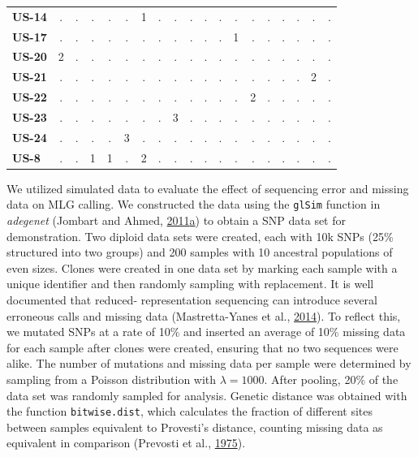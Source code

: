 \documentclass[double,12pt]{beavtex}
\begin{document}
\begin{table}
\begin{tabular}{l|cccccccccccccccccc}
    \textbf{US-14} & . & . & . & . & . & 1 & . & . & . & . & . & . & . & . & . & . & . & . \\ 
    \textbf{US-17} & . & . & . & . & . & . & . & . & . & . & . & 1 & . & . & . & . & . & . \\ 
    \textbf{US-20} & 2 & . & . & . & . & . & . & . & . & . & . & . & . & . & . & . & . & . \\ 
    \textbf{US-21} & . & . & . & . & . & . & . & . & . & . & . & . & . & . & . & . & 2 & . \\ 
    \textbf{US-22} & . & . & . & . & . & . & . & . & . & . & . & . & 2 & . & . & . & . & . \\ 
    \textbf{US-23} & . & . & . & . & . & . & . & 3 & . & . & . & . & . & . & . & . & . & . \\ 
    \textbf{US-24} & . & . & . & . & 3 & . & . & . & . & . & . & . & . & . & . & . & . & . \\ 
    \textbf{US-8} & . & . & 1 & 1 & . & 2 & . & . & . & . & . & . & . & . & . & . & . & . \\ 
     \bottomrule
  \end{tabular}
  \end{table}\newpage
  
  We utilized simulated data to evaluate the effect of sequencing error
  and missing data on MLG calling. We constructed the data using the
  \texttt{glSim} function in \emph{adegenet} (Jombart and Ahmed,
  \protect\hyperlink{ref-jombart2011adegenet}{2011}\protect\hyperlink{ref-jombart2011adegenet}{a})
  to obtain a SNP data set for demonstration. Two diploid data sets were
  created, each with 10k SNPs (25\% structured into two groups) and 200
  samples with 10 ancestral populations of even sizes. Clones were created
  in one data set by marking each sample with a unique identifier and then
  randomly sampling with replacement. It is well documented that reduced-
  representation sequencing can introduce several erroneous calls and
  missing data (Mastretta-Yanes et al.,
  \protect\hyperlink{ref-mastretta2015restriction}{2014}). To reflect
  this, we mutated SNPs at a rate of 10\% and inserted an average of 10\%
  missing data for each sample after clones were created, ensuring that no
  two sequences were alike. The number of mutations and missing data per
  sample were determined by sampling from a Poisson distribution with
  \(\lambda = 1000\). After pooling, 20\% of the data set was randomly
  sampled for analysis. Genetic distance was obtained with the function
  \texttt{bitwise.dist}, which calculates the fraction of different sites
  between samples equivalent to Provesti's distance, counting missing data
  as equivalent in comparison (Prevosti et al.,
  \protect\hyperlink{ref-prevosti1975distances}{1975}).
  
\end{document}
